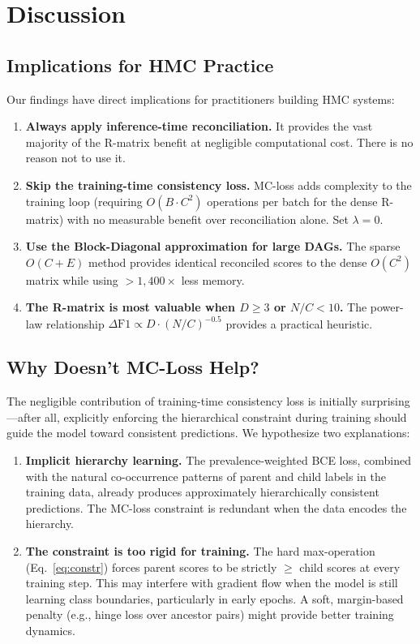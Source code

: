 \section{Discussion}
\label{sec:discussion}

\subsection{Implications for HMC Practice}

Our findings have direct implications for practitioners building HMC
systems:

\begin{enumerate}[leftmargin=*,nosep]
  \item \textbf{Always apply inference-time reconciliation.}
    It provides the vast majority of the R-matrix benefit at negligible
    computational cost. There is no reason not to use it.
  \item \textbf{Skip the training-time consistency loss.}
    MC-loss adds complexity to the training loop (requiring
    $O(B \cdot C^2)$ operations per batch for the dense R-matrix) with
    no measurable benefit over reconciliation alone. Set $\lambda=0$.
  \item \textbf{Use the Block-Diagonal approximation for large DAGs.}
    The sparse $O(C+E)$ method provides identical reconciled scores to
    the dense $O(C^2)$ matrix while using $>1{,}400\times$ less memory.
  \item \textbf{The R-matrix is most valuable when $D \geq 3$ or
    $N/C < 10$.} The power-law relationship
    $\Delta\text{F1} \propto D \cdot (N/C)^{-0.5}$ provides a
    practical heuristic.
\end{enumerate}

\subsection{Why Doesn't MC-Loss Help?}

The negligible contribution of training-time consistency loss is
initially surprising---after all, explicitly enforcing the hierarchical
constraint during training should guide the model toward consistent
predictions. We hypothesize two explanations:

\begin{enumerate}[leftmargin=*,nosep]
  \item \textbf{Implicit hierarchy learning.} The prevalence-weighted
    BCE loss, combined with the natural co-occurrence patterns of parent
    and child labels in the training data, already produces
    approximately hierarchically consistent predictions. The MC-loss
    constraint is redundant when the data encodes the hierarchy.
  \item \textbf{The constraint is too rigid for training.} The hard
    max-operation (Eq.~\ref{eq:constr}) forces parent scores to be
    strictly $\geq$ child scores at every training step. This may
    interfere with gradient flow when the model is still learning
    class boundaries, particularly in early epochs. A soft,
    margin-based penalty (e.g., hinge loss over ancestor pairs) might
    provide better training dynamics.
\end{enumerate}


